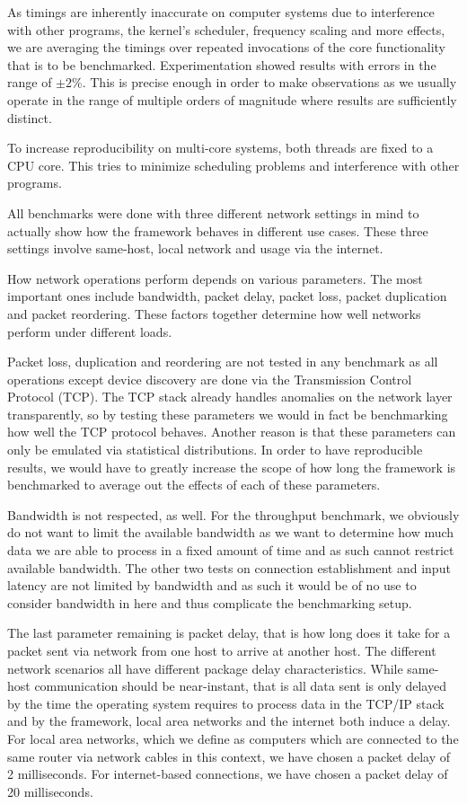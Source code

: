 As timings are inherently inaccurate on computer systems due to interference with other programs, the kernel's scheduler, frequency scaling and more effects, we are averaging the timings over repeated invocations of the core functionality that is to be benchmarked.
Experimentation showed results with errors in the range of $\pm2\%$.
This is precise enough in order to make observations as we usually operate in the range of multiple orders of magnitude where results are sufficiently distinct.

To increase reproducibility on multi-core systems, both threads are fixed to a CPU core.
This tries to minimize scheduling problems and interference with other programs.

\medskip

All benchmarks were done with three different network settings in mind to actually show how the framework behaves in different use cases.
These three settings involve same-host, local network and usage via the internet.

How network operations perform depends on various parameters.
The most important ones include bandwidth, packet delay, packet loss, packet duplication and packet reordering.
These factors together determine how well networks perform under different loads.

Packet loss, duplication and reordering are not tested in any benchmark as all operations except device discovery are done via the Transmission Control Protocol (TCP).
The TCP stack already handles anomalies on the network layer transparently, so by testing these parameters we would in fact be benchmarking how well the TCP protocol behaves.
Another reason is that these parameters can only be emulated via statistical distributions.
In order to have reproducible results, we would have to greatly increase the scope of how long the framework is benchmarked to average out the effects of each of these parameters.

Bandwidth is not respected, as well.
For the throughput benchmark, we obviously do not want to limit the available bandwidth as we want to determine how much data we are able to process in a fixed amount of time and as such cannot restrict available bandwidth.
The other two tests on connection establishment and input latency are not limited by bandwidth and as such it would be of no use to consider bandwidth in here and thus complicate the benchmarking setup.

The last parameter remaining is packet delay, that is how long does it take for a packet sent via network from one host to arrive at another host.
The different network scenarios all have different package delay characteristics.
While same-host communication should be near-instant, that is all data sent is only delayed by the time the operating system requires to process data in the TCP/IP stack and by the framework, local area networks and the internet both induce a delay.
For local area networks, which we define as computers which are connected to the same router via network cables in this context, we have chosen a packet delay of 2 milliseconds.
For internet-based connections, we have chosen a packet delay of 20 milliseconds.

